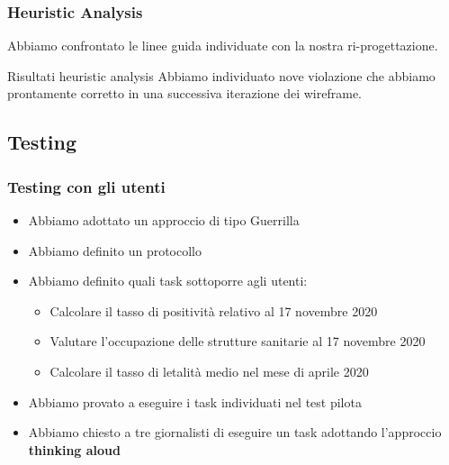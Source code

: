 \documentclass[handout]{beamer}
\begin{document}
		\begin{frame}
			\frametitle{Heuristic Analysis}
			Abbiamo confrontato le linee guida individuate con la nostra ri-progettazione. \newline \newline
			\begin{block}{Risultati heuristic analysis}
				Abbiamo individuato nove violazione che abbiamo prontamente corretto in una successiva iterazione dei wireframe.
		\end{block}
		\end{frame}

		\subsection{Testing}
		\begin{frame}
			\frametitle{Testing con gli utenti}
			\begin{itemize}[<+->]
				\item Abbiamo adottato un approccio di tipo Guerrilla\\ 
				\item Abbiamo definito un protocollo\\
				\item Abbiamo definito quali task sottoporre agli utenti:
					\begin{itemize}[<+->]
						\item Calcolare il tasso di positività relativo al 17 novembre 2020\\
						\item Valutare l'occupazione delle strutture sanitarie al 17 novembre 2020\\
						\item Calcolare il tasso di letalità medio nel mese di aprile 2020\\
					\end{itemize}
				\item Abbiamo provato a eseguire i task individuati nel test pilota\\
				\item Abbiamo chiesto a tre giornalisti di eseguire un task adottando l'approccio \textbf{thinking aloud}\\
			\end{itemize}
		\end{frame}
\end{document}
